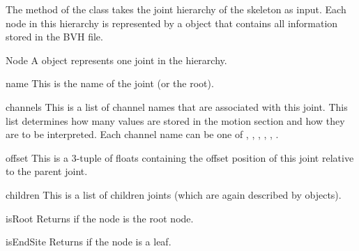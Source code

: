The  method of the  class takes
the joint hierarchy of the skeleton as input. Each node in this hierarchy
is represented by a  object that contains all information
stored in the BVH file.

\begin{classdesc*}{Node}
  A  object represents one joint in the hierarchy.
\end{classdesc*}

\begin{memberdesc}{name}
This is the name of the joint (or the root).
\end{memberdesc}

\begin{memberdesc}{channels}
This is a list of channel names that are associated with this joint.
This list determines how many values are stored in the motion section
and how they are to be interpreted. Each channel name can be one
of , , , ,
, .
\end{memberdesc}

\begin{memberdesc}{offset}
This is a 3-tuple of floats containing the offset position of this joint
relative to the parent joint.
\end{memberdesc}

\begin{memberdesc}{children}
This is a list of children joints (which are again described by
 objects).
\end{memberdesc}

\begin{methoddesc}{isRoot}{}
Returns  if the node is the root node.
\end{methoddesc}

\begin{methoddesc}{isEndSite}{}
Returns  if the node is a leaf.
\end{methoddesc}
